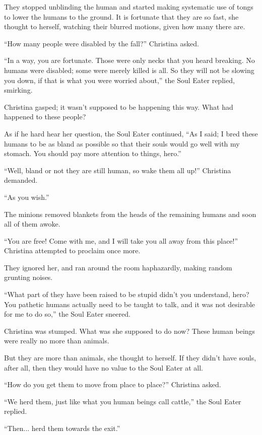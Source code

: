 \documentclass[showtrims,b6paper,draft,10pt]{memoir}
\begin{document}
They stopped unblinding the human and started making systematic use of tongs to lower the humans to the ground.  It is fortunate that they are so fast, she thought to herself, watching their blurred motions, given how many there are.

``How many people were disabled by the fall?''  Christina asked.

``In a way, you are fortunate.  Those were only necks that you heard breaking.  No humans were disabled;  some were merely killed is all.  So they will not be slowing you down, if that is what you were worried about,''  the Soul Eater replied, smirking.

Christina gasped;  it wasn't supposed to be happening this way.  What had happened to these people?

As if he hard hear her question, the Soul Eater continued, ``As I said;  I bred these humans to be as bland as possible so that their souls would go well with my stomach.  You should pay more attention to things, hero.''

``Well, bland or not they are still human, so wake them all up!''  Christina demanded.

``As you wish.''

The minions removed blankets from the heads of the remaining humans and soon all of them awoke.

``You are free!  Come with me, and I will take you all away from this place!''  Christina attempted to proclaim once more.

They ignored her, and ran around the room haphazardly, making random grunting noises.

``What part of they have been raised to be stupid didn't you understand, hero?  You pathetic humans actually need to be taught to talk, and it was not desirable for me to do so,'' the Soul Eater sneered.

Christina was stumped.  What was she supposed to do now?  These human beings were really no more than animals.

But they are more than animals, she thought to herself.  If they didn't have souls, after all, then they would have no value to the Soul Eater at all.

``How do you get them to move from place to place?'' Christina asked.

``We herd them, just like what you human beings call cattle,'' the Soul Eater replied.

``Then... herd them towards the exit.''
\end{document}
